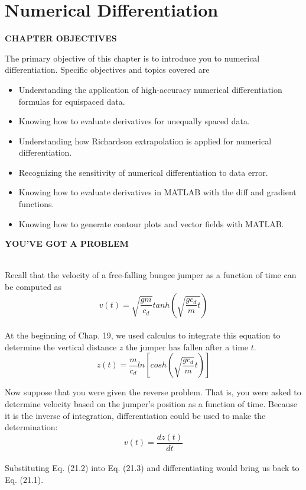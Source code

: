 \documentclass[../main.tex]{subfiles}
\begin{document}
\chapter{Numerical Differentiation}

\vspace{1,5in}

\begin{center}\begin{Large}\textbf{CHAPTER OBJECTIVES}\end{Large}\end{center}
The primary objective of this chapter is to introduce you to numerical differentiation.
Specific objectives and topics covered are

\begin{itemize}
	\item Understanding the application of high-accuracy numerical differentiation
formulas for equispaced data.
	\item Knowing how to evaluate derivatives for unequally spaced data.
	\item Understanding how Richardson extrapolation is applied for numerical
differentiation.
	\item Recognizing the sensitivity of numerical differentiation to data error.
	\item Knowing how to evaluate derivatives in MATLAB with the diff and gradient
functions.
	\item Knowing how to generate contour plots and vector fields with MATLAB.
\end{itemize}
\vspace{0.3in}
\begin{Large}\textbf{YOU'VE GOT A PROBLEM}\end{Large}\\
Recall that the velocity of a free-falling bungee jumper as a function of time can be
computed as
\begin{equation}
	\tag{21.1}
	v(t) = \sqrt{\dfrac{gm}{c_{d}}} tanh \left( \sqrt{\dfrac{gc_{d}}{m} t} \right)
\end{equation}\\
At the beginning of Chap. 19, we used calculus to integrate this equation to determine the
vertical distance $z$ the jumper has fallen after a time $t$.
\begin{equation}
	\tag{21.2}
	z(t) = \dfrac{m}{c_{d}} ln \left[ cosh \left( \sqrt{\dfrac{gc_{d}}{m}} t \right) \right]
\end{equation}

Now suppose that you were given the reverse problem. That is, you were asked to determine velocity based on the jumper's position as a function of time. Because it is the inverse of integration, differentiation could be used to make the determination:
\begin{equation}
	\tag{21.3}
	v(t) = \dfrac{dz(t)}{dt}
\end{equation}\\
Substituting Eq. (21.2) into Eq. (21.3) and differentiating would bring us back to Eq. (21.1).
\end{document}
